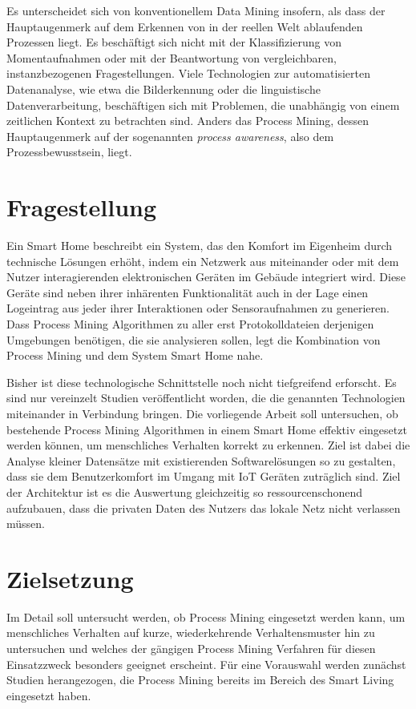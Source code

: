 Es unterscheidet sich von konventionellem Data Mining insofern, als dass der Hauptaugenmerk auf dem Erkennen von in der reellen Welt ablaufenden Prozessen liegt. Es beschäftigt sich nicht mit der Klassifizierung von Momentaufnahmen oder mit der Beantwortung von vergleichbaren, instanzbezogenen Fragestellungen. Viele Technologien zur automatisierten Datenanalyse,  wie etwa die Bilderkennung oder die linguistische Datenverarbeitung, beschäftigen sich mit Problemen, die unabhängig von einem zeitlichen Kontext zu betrachten sind. Anders das Process Mining, dessen Hauptaugenmerk auf der sogenannten \textit{process awareness}, also dem Prozessbewusstsein, liegt.
\section{Fragestellung}
Ein Smart Home beschreibt ein System, das den Komfort im Eigenheim durch technische Lösungen erhöht, indem ein Netzwerk aus miteinander oder mit dem Nutzer interagierenden elektronischen Geräten im Gebäude integriert wird. Diese Geräte sind neben ihrer inhärenten Funktionalität auch in der Lage einen Logeintrag aus jeder ihrer Interaktionen oder Sensoraufnahmen zu generieren. Dass Process Mining Algorithmen zu aller erst Protokolldateien derjenigen Umgebungen benötigen, die sie analysieren sollen, legt die Kombination von Process Mining und dem System Smart Home nahe.
 
Bisher ist diese technologische Schnittstelle noch nicht tiefgreifend erforscht. Es sind nur vereinzelt Studien veröffentlicht worden, die die genannten Technologien miteinander in Verbindung bringen. Die vorliegende Arbeit soll untersuchen, ob bestehende Process Mining Algorithmen in einem Smart Home effektiv eingesetzt werden können, um menschliches Verhalten korrekt zu erkennen. 
Ziel ist dabei die Analyse kleiner Datensätze mit existierenden Softwarelösungen so zu gestalten, dass sie dem Benutzerkomfort im Umgang mit IoT Geräten zuträglich sind. Ziel der Architektur ist es die Auswertung gleichzeitig so ressourcenschonend aufzubauen, dass die privaten Daten des Nutzers das lokale Netz nicht verlassen müssen.

\section{Zielsetzung}
Im Detail soll untersucht werden, ob Process Mining eingesetzt werden kann, um menschliches Verhalten auf kurze, wiederkehrende Verhaltensmuster hin zu untersuchen und welches der gängigen Process Mining Verfahren für diesen Einsatzzweck besonders geeignet erscheint. 
Für eine Vorauswahl werden zunächst Studien herangezogen, die Process Mining bereits im Bereich des Smart Living eingesetzt haben.

